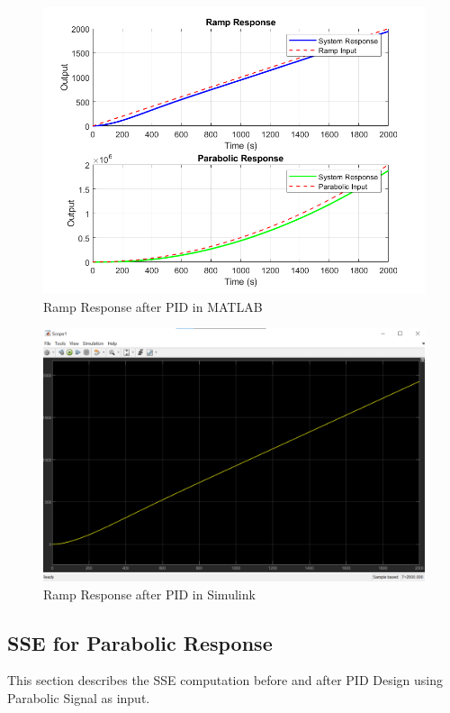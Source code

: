 \documentclass{article}
\begin{document}
\begin{figure}[h!]
	\centering
	\includegraphics[scale=0.5]{images/rampparabolicResponse_PID_MATLAB.png}
	\caption{Ramp Response after PID in MATLAB}
	\label{fig:rampResponse_PID_MATLAB}
\end{figure}

\begin{figure}[h!]
	\centering
	\includegraphics[scale=0.45]{images/rampResponse_PID_Simulink.png}
	\caption{Ramp Response after PID in Simulink}
	\label{fig:rampResponse_PID_Simulink}
\end{figure}

\subsection{SSE for Parabolic Response}
This section describes the SSE computation before and after PID Design using Parabolic Signal as input.
\end{document}
